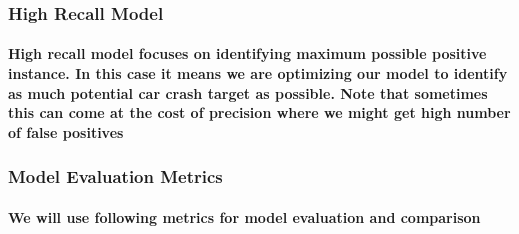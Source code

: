 \documentclass[]{article}
\let\oldparagraph\paragraph
\renewcommand{\paragraph}[1]{\oldparagraph{#1}\mbox{}}
\begin{document}
\hypertarget{high-recall-model}{%
\subsubsection{\texorpdfstring{\textbf{High Recall
Model}}{High Recall Model}}\label{high-recall-model}}

\hypertarget{high-recall-model-focuses-on-identifying-maximum-possible-positive-instance.-in-this-case-it-means-we-are-optimizing-our-model-to-identify-as-much-potential-car-crash-target-as-possible.-note-that-sometimes-this-can-come-at-the-cost-of-precision-where-we-might-get-high-number-of-false-positives}{%
\paragraph{High recall model focuses on identifying maximum possible
positive instance. In this case it means we are optimizing our model to
identify as much potential car crash target as possible. Note that
sometimes this can come at the cost of precision where we might get high
number of false
positives}\label{high-recall-model-focuses-on-identifying-maximum-possible-positive-instance.-in-this-case-it-means-we-are-optimizing-our-model-to-identify-as-much-potential-car-crash-target-as-possible.-note-that-sometimes-this-can-come-at-the-cost-of-precision-where-we-might-get-high-number-of-false-positives}}

\hypertarget{model-evaluation-metrics}{%
\subsubsection{\texorpdfstring{\textbf{Model Evaluation
Metrics}}{Model Evaluation Metrics}}\label{model-evaluation-metrics}}

\hypertarget{we-will-use-following-metrics-for-model-evaluation-and-comparison}{%
\paragraph{We will use following metrics for model evaluation and
comparison}\label{we-will-use-following-metrics-for-model-evaluation-and-comparison}}
\end{document}
